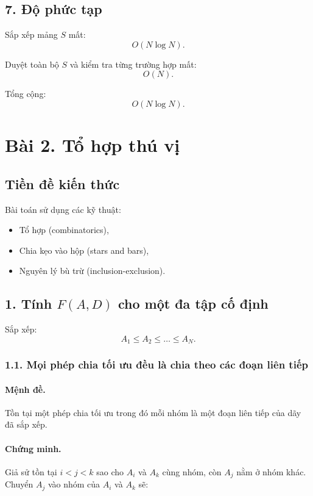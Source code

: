 \subsection*{7. Độ phức tạp}

Sắp xếp mảng $S$ mất:
\[
O(N \log N).
\]

Duyệt toàn bộ $S$ và kiểm tra từng trường hợp mất:
\[
O(N).
\]

Tổng cộng:
\[
O(N \log N).
\]

\newpage

\section*{Bài 2. Tổ hợp thú vị}

\subsection*{Tiền đề kiến thức}
Bài toán sử dụng các kỹ thuật:
\begin{itemize}
    \item Tổ hợp (combinatorics),
    \item Chia kẹo vào hộp (stars and bars),
    \item Nguyên lý bù trừ (inclusion-exclusion).
\end{itemize}

\subsection*{1. Tính $F(A, D)$ cho một đa tập cố định}

Sắp xếp:
\[
A_1 \le A_2 \le \dots \le A_N.
\]

\subsubsection*{1.1. Mọi phép chia tối ưu đều là chia theo các đoạn liên tiếp}

\paragraph{Mệnh đề.} Tồn tại một phép chia tối ưu trong đó mỗi nhóm là một đoạn liên tiếp của dãy đã sắp xếp.

\paragraph{Chứng minh.}
Giả sử tồn tại $i < j < k$ sao cho $A_i$ và $A_k$ cùng nhóm, còn $A_j$ nằm ở nhóm khác.  
Chuyển $A_j$ vào nhóm của $A_i$ và $A_k$ sẽ:

